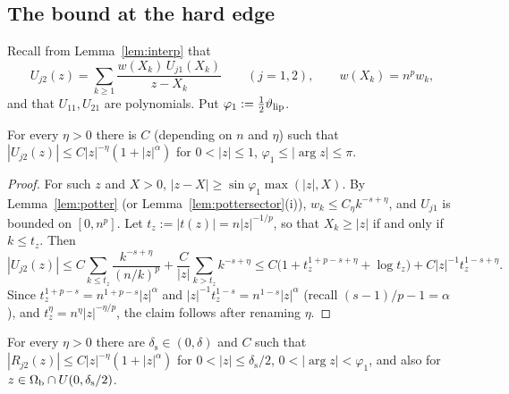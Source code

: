 \subsection{The bound at the hard edge}

Recall from Lemma~\ref{lem:interp} that
\begin{equation}\label{eq:U-sum}
  U_{j2}(z)=\sum_{k\ge1}\frac{w(X_k)\,U_{j1}(X_k)}{z-X_k}\qquad(j=1,2),\qquad w(X_k)=n^pw_k,
\end{equation}
and that $U_{11},U_{21}$ are polynomials. Put $\varphi_1:=\frac12\vartheta_{\mathrm{lip}}$.

\begin{lemma}\label{lem:sumbound}
For every $\eta>0$ there is $C$ (depending on $n$ and $\eta$) such that $|U_{j2}(z)|\le C|z|^{-\eta}(1+|z|^{\alpha})$ for
$0<|z|\le1$, $\varphi_1\le|\arg z|\le\pi$.
\end{lemma}

\begin{proof}
For such $z$ and $X>0$, $|z-X|\ge\sin\varphi_1\max(|z|,X)$. By Lemma~\ref{lem:potter} (or Lemma~\ref{lem:pottersector}(i)),
$w_k\le C_\eta k^{-s+\eta}$, and $U_{j1}$ is bounded on $[0,n^p]$. Let $t_z:=|t(z)|=n|z|^{-1/p}$, so that $X_k\ge|z|$ if and only if
$k\le t_z$. Then
\[
  |U_{j2}(z)|\le C\sum_{k\le t_z}\frac{k^{-s+\eta}}{(n/k)^p}+\frac C{|z|}\sum_{k>t_z}k^{-s+\eta}
  \le C\bigl(1+t_z^{1+p-s+\eta}+\log t_z\bigr)+C|z|^{-1}t_z^{1-s+\eta}.
\]
Since $t_z^{1+p-s}=n^{1+p-s}|z|^{\alpha}$ and $|z|^{-1}t_z^{1-s}=n^{1-s}|z|^{\alpha}$ (recall $(s-1)/p-1=\alpha$), and
$t_z^\eta=n^\eta|z|^{-\eta/p}$, the claim follows after renaming $\eta$.
\end{proof}

\begin{lemma}\label{lem:lenssector}
For every $\eta>0$ there are $\delta_{\mathrm s}\in(0,\delta)$ and $C$ such that $|R_{j2}(z)|\le C|z|^{-\eta}(1+|z|^\alpha)$ for
$0<|z|\le\delta_{\mathrm s}/2$, $0<|\arg z|<\varphi_1$, and also for $z\in\Omega_{\mathrm{b}}\cap U(0,\delta_{\mathrm s}/2)$.
\end{lemma}

